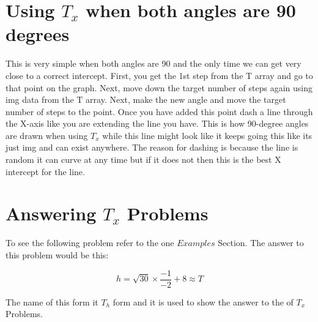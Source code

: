 \documentclass{article}
\begin{document}
 \section{Using \(T_x\) when both angles are 90 degrees}
 This is very simple when both angles are 90 and the only time we can get very close to a correct intercept. First, you get the 1st step from the T array and go to that point on the graph. Next, move down the target number of steps again using img data from the T array. Next, make the new angle and move the target number of steps to the point. Once you have added this point dash a line through the X-axis like you are extending the line you have. This is how 90-degree angles are drawn when using \(T_x\) while this line might look like it keeps going this like its just img and can exist anywhere. The reason for dashing is because the line is random it can curve at any time but if it does not then this is the best X intercept for the line.


\section{Answering \(T_x\) Problems}
To see the following problem refer to the one \(Examples\) Section. The answer to this problem would be this:

\[
 h = \sqrt{30} \times \frac{-1}{-2} + 8 \approx T 
\]

The name of this form it \(T_h\) form and it is used to show the answer to the of \(T_x\) Problems.
\end{document}
